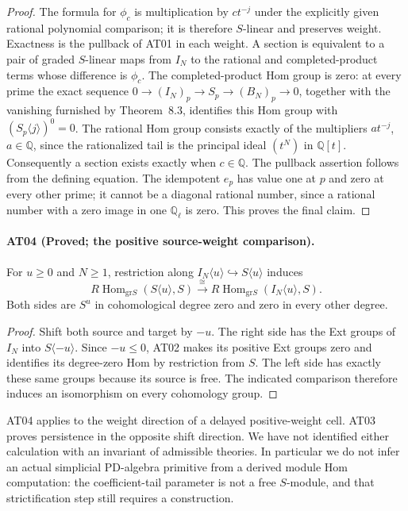\begin{proof}
The formula for $\phi_c$ is multiplication by $c t^{-j}$
under the explicitly given rational polynomial comparison;
it is therefore $S$-linear and preserves weight.
Exactness is the pullback of AT01 in each weight.
A section is equivalent to a pair of graded $S$-linear maps
from $I_N$ to the rational and completed-product terms whose
difference is $\phi_c$. The completed-product Hom group is
zero: at every prime the exact sequence
$0\to(I_N)_p\to S_p\to(B_N)_p\to0$, together with the
vanishing furnished by Theorem~8.3, identifies this Hom
group with $(S_p\langle j\rangle)^0=0$.
The rational Hom group consists exactly of the multipliers
$a t^{-j}$, $a\in\mathbb Q$, since the rationalized tail
is the principal ideal $(t^N)$ in $\mathbb Q[t]$.
Consequently a section exists exactly when $c\in\mathbb Q$.
The pullback assertion follows from the defining equation.
The idempotent $e_p$ has value one at $p$ and zero at every
other prime; it cannot be a diagonal rational number, since
a rational number with a zero image in one $\mathbb Q_\ell$
is zero. This proves the final claim.
\end{proof}

\paragraph{AT04 (Proved; the positive source-weight comparison).}
For $u\geq0$ and $N\geq1$, restriction along
$I_N\langle u\rangle\hookrightarrow S\langle u\rangle$
induces
\[
 R\operatorname{Hom}_{\mathrm{gr}S}
       (S\langle u\rangle,S)
 \xrightarrow{\ \cong\ }
 R\operatorname{Hom}_{\mathrm{gr}S}
       (I_N\langle u\rangle,S).
\]
Both sides are $S^u$ in cohomological degree zero and zero
in every other degree.

\begin{proof}
Shift both source and target by $-u$. The right side has
the Ext groups of $I_N$ into $S\langle-u\rangle$.
Since $-u\leq0$, AT02 makes its positive Ext groups zero
and identifies its degree-zero Hom by restriction from
$S$. The left side has exactly these same groups because
its source is free. The indicated comparison therefore
induces an isomorphism on every cohomology group.
\end{proof}

AT04 applies to the weight direction of a delayed
positive-weight cell. AT03 proves persistence in the
opposite shift direction. We have not identified either
calculation with an invariant of admissible theories.
In particular we do not infer an actual simplicial
PD-algebra primitive from a derived module Hom computation:
the coefficient-tail parameter is not a free $S$-module,
and that strictification step still requires a construction.

